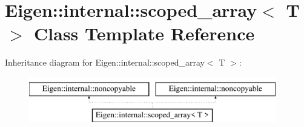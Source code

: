 \hypertarget{class_eigen_1_1internal_1_1scoped__array}{}\section{Eigen\+:\+:internal\+:\+:scoped\+\_\+array$<$ T $>$ Class Template Reference}
\label{class_eigen_1_1internal_1_1scoped__array}
Inheritance diagram for Eigen\+:\+:internal\+:\+:scoped\+\_\+array$<$ T $>$\+:\begin{figure}[H]
\begin{center}
\leavevmode
\includegraphics[height=2.000000cm]{class_eigen_1_1internal_1_1scoped__array}
\end{center}
\end{figure}

